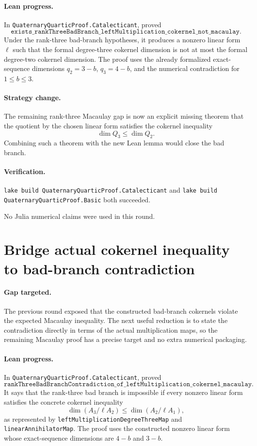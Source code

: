 \documentclass[11pt]{article}
\begin{document}
\paragraph{Lean progress.}
In \texttt{QuaternaryQuarticProof.Catalecticant}, proved
\[
\texttt{exists\_rankThreeBadBranch\_leftMultiplication\_cokernel\_not\_macaulay}.
\]
Under the rank-three bad-branch hypotheses, it produces a nonzero linear form
\(\ell\) such that the formal degree-three cokernel dimension is not at most
the formal degree-two cokernel dimension.  The proof uses the already
formalized exact-sequence dimensions \(q_2=3-b\), \(q_3=4-b\), and the
numerical contradiction for \(1\le b\le3\).

\paragraph{Strategy change.}
The remaining rank-three Macaulay gap is now an explicit missing theorem that
the quotient by the chosen linear form satisfies the cokernel inequality
\[
\dim Q_3 \le \dim Q_2.
\]
Combining such a theorem with the new Lean lemma would close the bad branch.

\paragraph{Verification.}
\texttt{lake build QuaternaryQuarticProof.Catalecticant} and
\texttt{lake build QuaternaryQuarticProof.Basic} both succeeded.

No Julia numerical claims were used in this round.

\section*{Bridge actual cokernel inequality to bad-branch contradiction}

\paragraph{Gap targeted.}
The previous round exposed that the constructed bad-branch cokernels violate
the expected Macaulay inequality.  The next useful reduction is to state the
contradiction directly in terms of the actual multiplication maps, so the
remaining Macaulay proof has a precise target and no extra numerical
packaging.

\paragraph{Lean progress.}
In \texttt{QuaternaryQuarticProof.Catalecticant}, proved
\[
\texttt{rankThreeBadBranchContradiction\_of\_leftMultiplication\_cokernel\_macaulay}.
\]
It says that the rank-three bad branch is impossible if every nonzero linear
form satisfies the concrete cokernel inequality
\[
\dim\left(A_3/\ell A_2\right)\le
\dim\left(A_2/\ell A_1\right),
\]
as represented by
\texttt{leftMultiplicationDegreeThreeMap} and
\texttt{linearAnnihilatorMap}.  The proof uses the constructed nonzero
linear form whose exact-sequence dimensions are \(4-b\) and \(3-b\).
\end{document}
